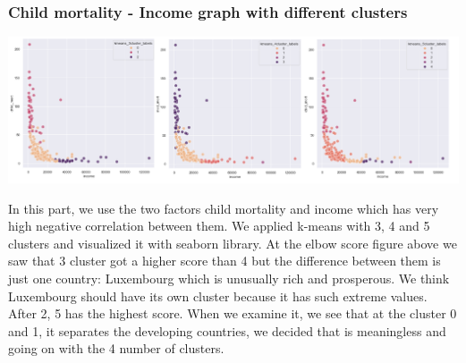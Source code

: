 \documentclass[onecolumn]{article}
\begin{document}
\subsubsection{Child mortality - Income graph with different clusters}
\begin{center}
    \includegraphics[scale=0.50]{123.png}
\end{center}
\large
In this part, we use the two factors child mortality and income which has very high negative correlation between them. We applied k-means with  3, 4 and 5 clusters and visualized it with seaborn library. At the elbow score figure above we saw that 3 cluster got a higher score than 4 but the difference between them is just one country: Luxembourg which is unusually rich and prosperous. We think Luxembourg should have its own cluster because it has such extreme values. After 2, 5 has the highest score. When we examine it, we see that at the cluster 0 and 1, it separates the developing countries, we decided that is meaningless and going on with the 4 number of clusters.

\normalsize
\end{document}
